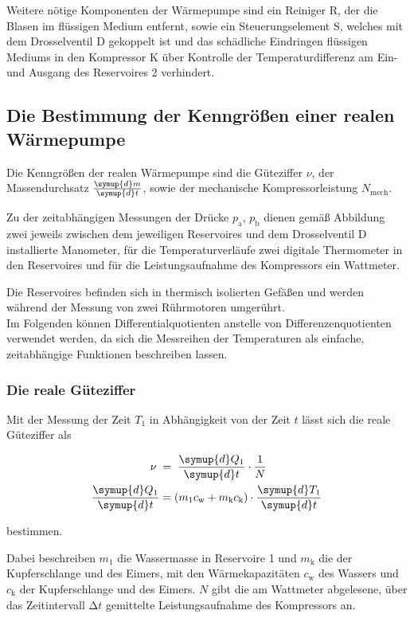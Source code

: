 Weitere nötige Komponenten der Wärmepumpe sind ein Reiniger R, der die Blasen 
im flüssigen Medium entfernt, sowie ein Steuerungselement S, welches mit dem 
Drosselventil D gekoppelt ist und das schädliche Eindringen flüssigen 
Mediums in den Kompressor K über Kontrolle der Temperaturdifferenz am Ein- 
und Ausgang des Reservoires 2 verhindert.

\subsection{Die Bestimmung der Kenngrößen einer realen Wärmepumpe}

Die Kenngrößen der realen Wärmepumpe sind die Güteziffer $\nu$, der 
Massendurchsatz $\frac{\symup{d}m}{\symup{d}t}$, sowie der mechanische 
Kompressorleistung $N_\text{mech}$.

Zu der zeitabhängigen Messungen der Drücke $p_\text{a}$, $p_\text{b}$ 
dienen gemäß Abbildung  zwei jeweils zwischen dem jeweiligen Reservoires und dem 
Drosselventil D installierte Manometer, für die Temperaturverläufe 
zwei digitale Thermometer in den Reservoires und für die Leistungsaufnahme
des Kompressors ein Wattmeter.

Die Reservoires befinden sich in thermisch isolierten Gefäßen und werden während
der Messung von zwei Rührmotoren umgerührt. \\

Im Folgenden können Differentialquotienten anstelle von Differenzenquotienten 
verwendet werden, da sich die Messreihen der Temperaturen als einfache, zeitabhängige
Funktionen beschreiben lassen.

\subsubsection{Die reale Güteziffer}


Mit der Messung der Zeit $T_1$ in Abhängigkeit von der Zeit $t$ lässt sich die
reale Güteziffer als

\begin{align}
    \nu \; &= \; \frac{\symup{d} Q_1}{\symup{d} t} \cdot \frac{1}{N} \\
    \frac{\symup{d} Q_1}{\symup{d} t} &= (m_1 c_\text{w} + m_\text{k} c_\text{k})
    \cdot \frac{\symup{d} T_1}{\symup{d} t}
\end{align}

bestimmen. 

Dabei beschreiben $m_1$ die Wassermasse in Reservoire 1 und $m_\text{k}$
die der Kupferschlange und des Eimers, mit den Wärmekapazitäten $c_\text{w}$ 
des Wassers und $c_\text{k}$ der Kupferschlange und des Eimers.
$N$ gibt die am Wattmeter abgelesene, über das Zeitintervall $\increment t$
gemittelte Leistungsaufnahme des Kompressors an.

